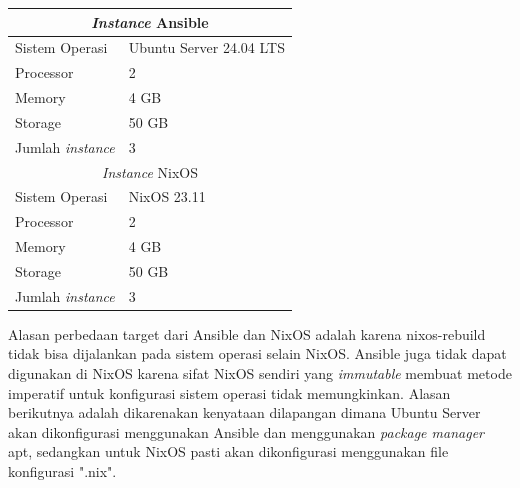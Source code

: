 \documentclass[10pt,]{report}
\begin{document}
\begin{adjustwidth}{20pt}{}
\begin{table}[!htbp]
\begin{center}
			\begin{tabular}{|l|l|}
				\hline
				\multicolumn{2}{|c|}{\textit{Instance} Ansible}    \\
				\hline
				Sistem Operasi           & Ubuntu Server 24.04 LTS \\
				\hline
				Processor                & 2                       \\
				\hline
				Memory                   & 4 GB                    \\
				\hline
				Storage                  & 50 GB                   \\
				\hline
				Jumlah \textit{instance} & 3                       \\
				\hline
				\multicolumn{2}{|c|}{\textit{Instance} NixOS}      \\
				\hline
				Sistem Operasi           & NixOS 23.11             \\
				\hline
				Processor                & 2                       \\
				\hline
				Memory                   & 4 GB                    \\
				\hline
				Storage                  & 50 GB                   \\
				\hline
				Jumlah \textit{instance} & 3                       \\
				\hline
			\end{tabular}
		\end{center}
	\end{table}
	\begin{adjustwidth}{20pt}{}
		Alasan perbedaan target dari Ansible dan NixOS adalah karena nixos-rebuild
		tidak bisa dijalankan pada sistem operasi selain NixOS. Ansible juga tidak
		dapat digunakan di NixOS karena sifat NixOS sendiri yang \textit{immutable}
		membuat metode imperatif untuk konfigurasi sistem operasi tidak memungkinkan.
		Alasan berikutnya adalah dikarenakan kenyataan dilapangan dimana Ubuntu Server
		akan dikonfigurasi menggunakan Ansible dan menggunakan \textit{package manager} apt,
		sedangkan untuk NixOS pasti akan dikonfigurasi menggunakan file konfigurasi ".nix".
	\end{adjustwidth}

\end{adjustwidth}
\end{document}
